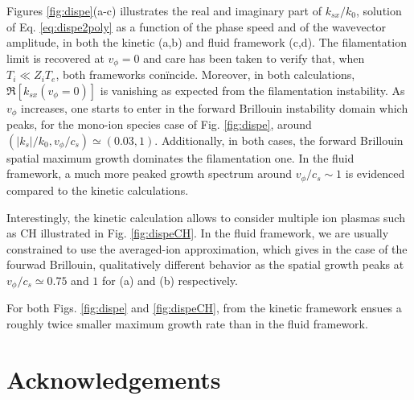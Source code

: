 \documentclass[
 reprint,
 amsmath,amssymb,
 aps,
]{revtex4-1}
\begin{document}
Figures \ref{fig:dispe}(a-c)  illustrates the real and imaginary part of $k_{sx}/k_0$, solution of Eq. \eqref{eq:dispe2poly} as a function of the phase speed and of the wavevector amplitude, in both the kinetic (a,b) and fluid framework (c,d). The filamentation limit is recovered at $v_\phi=0$ and care has been taken to verify that, when $T_i\ll Z_iT_e$, both frameworks con\"incide. Moreover, in both calculations, $\Re[k_{sx}(v_\phi=0)]$ is vanishing as expected from the filamentation instability. As $v_\phi$ increases, one starts to enter in the forward Brillouin instability domain which peaks, for the mono-ion species case of Fig. \ref{fig:dispe}, around $(\vert k_s\vert/k_0, v_\phi/c_s) \simeq(0.03,1)$. Additionally, in both cases, the forward Brillouin spatial maximum  growth dominates the filamentation one. In the fluid framework, a much more peaked growth spectrum around  $ v_\phi/c_s\sim 1 $ is evidenced compared to the kinetic calculations. 

Interestingly, the kinetic calculation allows to consider multiple ion plasmas such as CH  illustrated in Fig. \ref{fig:dispeCH}. In the fluid framework, we are usually constrained to use the averaged-ion approximation, which gives in the case of the fourwad Brillouin, qualitatively different behavior as the spatial growth peaks at $v_\phi/c_s \simeq 0.75$ and $1$ for (a) and (b) respectively. 

For both Figs. \ref{fig:dispe} and \ref{fig:dispeCH}, from the kinetic framework ensues a  roughly twice smaller maximum growth rate than in the fluid framework. 

\section*{Acknowledgements}

\end{document}
